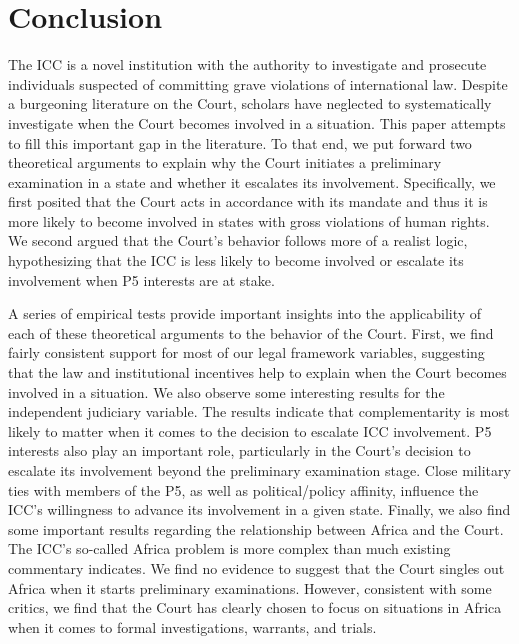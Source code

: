 \section*{Conclusion}

The ICC is a novel institution with the authority to investigate and prosecute individuals suspected of committing grave violations of international law.  Despite a burgeoning literature on the Court, scholars have neglected to systematically investigate when the Court becomes involved in a situation.  This paper attempts to fill this important gap in the literature. To that end, we put forward two theoretical arguments to explain why the Court initiates a preliminary examination in a state and whether it escalates its involvement.  Specifically, we first posited that the Court acts in accordance with its mandate and thus it is more likely to become involved in states with gross violations of human rights. We second argued that the Court’s behavior follows more of a realist logic, hypothesizing that the ICC is less likely to become involved or escalate its involvement when P5 interests are at stake. 

A series of empirical tests provide important insights into the applicability of each of these theoretical arguments to the behavior of the Court. First, we find fairly consistent support for most of our legal framework variables, suggesting that the law and institutional incentives help to explain when the Court becomes involved in a situation. We also observe some interesting results for the independent judiciary variable. The results indicate that complementarity is most likely to matter when it comes to the decision to escalate ICC involvement.  P5 interests also play an important role, particularly in the Court’s decision to escalate its involvement beyond the preliminary examination stage.  Close military ties with members of the P5, as well as political/policy affinity, influence the ICC’s willingness to advance its involvement in a given state.  Finally, we also find some important results regarding the relationship between Africa and the Court.  The ICC’s so-called Africa problem is more complex than much existing commentary indicates. We find no evidence to suggest that the Court singles out Africa when it starts preliminary examinations. However, consistent with some critics, we find that the Court has clearly chosen to focus on situations in Africa when it comes to formal investigations, warrants, and trials. 	

